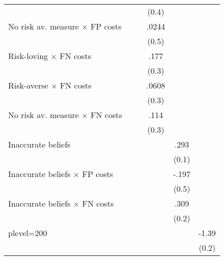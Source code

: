 \begin{table}[htbp]
\begin{tabular}{l*{5}{c}}
                &                  &                  &    (0.4)         &                  &                  \\
No risk av. measure $\times$ FP costs&                  &                  &    .0244         &                  &                  \\
                &                  &                  &    (0.5)         &                  &                  \\
Risk-loving $\times$ FN costs&                  &                  &     .177         &                  &                  \\
                &                  &                  &    (0.3)         &                  &                  \\
Risk-averse $\times$ FN costs&                  &                  &    .0608         &                  &                  \\
                &                  &                  &    (0.3)         &                  &                  \\
No risk av. measure $\times$ FN costs&                  &                  &     .114         &                  &                  \\
                &                  &                  &    (0.3)         &                  &                  \\
Inaccurate beliefs&                  &                  &                  &     .293\sym{**} &                  \\
                &                  &                  &                  &    (0.1)         &                  \\
Inaccurate beliefs $\times$ FP costs&                  &                  &                  &    -.197         &                  \\
                &                  &                  &                  &    (0.5)         &                  \\
Inaccurate beliefs $\times$ FN costs&                  &                  &                  &     .309         &                  \\
                &                  &                  &                  &    (0.2)         &                  \\
plevel=200      &                  &                  &                  &                  &    -1.39\sym{***}\\
                &                  &                  &                  &                  &    (0.2)         \\

\end{tabular}
\end{table}
